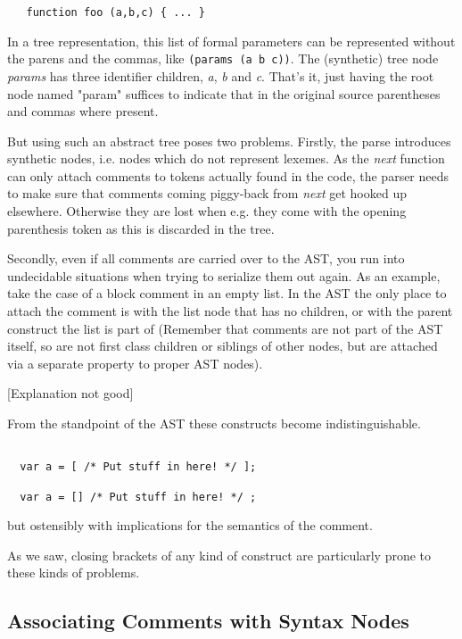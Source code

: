 \documentclass[11pt,a4paper]{article}
\begin{document}
\begin{verbatim}
   function foo (a,b,c) { ... }
\end{verbatim}

In a tree representation, this list of formal parameters can be represented
without the parens and the commas, like \texttt{(params (a b c))}. The
(synthetic) tree node \emph{params} has three identifier children, \emph{a},
\emph{b} and \emph{c}. That's it, just having the root node named "param"
suffices to indicate that in the original source parentheses and commas where
present.

But using such an abstract tree poses two problems. Firstly, the parse
introduces synthetic nodes, i.e. nodes which do not represent lexemes. As the
\emph{next} function can only attach comments to tokens actually found in the
code, the parser needs to make sure that comments coming piggy-back from
\emph{next} get hooked up elsewhere. Otherwise they are lost when e.g. they come
with the opening parenthesis token as this is discarded in the tree.

Secondly, even if all comments are carried over to the AST, you run into
undecidable situations when trying to serialize them out again. As an example,
take the case of a block comment in an empty list. In the AST the only place to
attach the comment is with the list node that has no children, or with the
parent construct the list is part of (Remember that
comments are not part of the AST itself, so are not first class children or
siblings of
other nodes,  but are attached via a separate property to proper AST nodes).

[Explanation not good]

From the standpoint of the AST these constructs become indistinguishable.

\begin{verbatim}

  var a = [ /* Put stuff in here! */ ];

  var a = [] /* Put stuff in here! */ ;

\end{verbatim}

but ostensibly with implications for the semantics of the comment.

As we saw, closing brackets of any kind of construct are
particularly prone to these kinds of problems.

\subsection{Associating Comments with Syntax Nodes}
\end{document}
